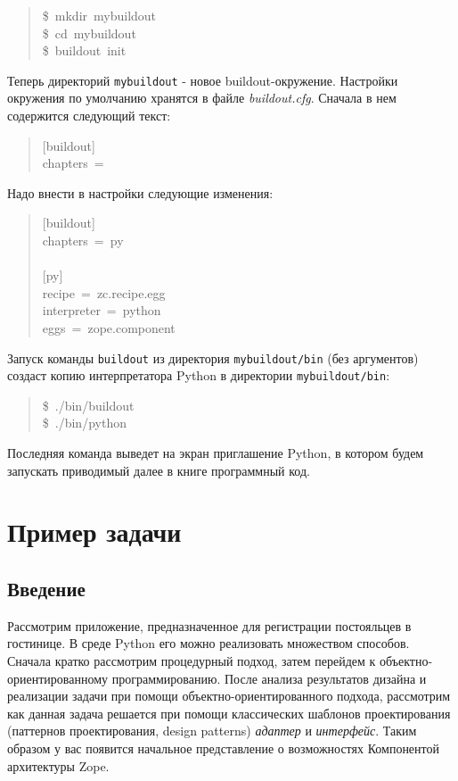 \documentclass[a4paper,openany,twoside,final]{book}
\providecommand*{\DUroletitlereference}[1]{\textsl{#1}}
\begin{document}
\begin{quote}{\ttfamily \raggedright \noindent
\$~mkdir~mybuildout\\
\$~cd~mybuildout\\
\$~buildout~init
}
\end{quote}

Теперь директорий \texttt{mybuildout} - новое buildout-окружение.  Настройки
окружения по умолчанию хранятся в файле \DUroletitlereference{buildout.cfg}.  Сначала в нем
содержится следующий текст:

\begin{quote}{\ttfamily \raggedright \noindent
{[}buildout{]}\\
chapters~=
}
\end{quote}

Надо внести в настройки следующие изменения:

\begin{quote}{\ttfamily \raggedright \noindent
{[}buildout{]}\\
chapters~=~py\\
~\\
{[}py{]}\\
recipe~=~zc.recipe.egg\\
interpreter~=~python\\
eggs~=~zope.component
}
\end{quote}

Запуск команды \texttt{buildout} из директория \texttt{mybuildout/bin} (без
аргументов) создаст копию интерпретатора Python в директории
\texttt{mybuildout/bin}:

\begin{quote}{\ttfamily \raggedright \noindent
\$~./bin/buildout\\
\$~./bin/python
}
\end{quote}

Последняя команда выведет на экран приглашение Python, в котором
будем запускать приводимый далее в книге программный код.


\chapter{Пример задачи%
  \label{id17}%
}


\section{Введение%
  \label{id18}%
}

Рассмотрим приложение, предназначенное для регистрации постояльцев в
гостинице.  В среде Python его можно реализовать множеством способов.
Сначала кратко рассмотрим процедурный подход, затем перейдем к
объектно-ориентированному программированию.  После анализа результатов
дизайна и реализации задачи при помощи объектно-ориентированного
подхода, рассмотрим как данная задача решается при помощи классических
шаблонов проектирования (паттернов проектирования, design patterns)
\DUroletitlereference{адаптер} и \DUroletitlereference{интерфейс}.  Таким образом у вас появится начальное
представление о возможностях Компонентой архитектуры Zope.
\end{document}
